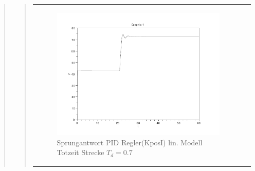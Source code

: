 \begin{quote}
    \begin{quote}
 
            \begin{center}
                \begin{tabular}{ll}
                
                \hspace{-1cm}
                    \begin{minipage}{0.6\textwidth}
                        \begin{figure}[H]
                            \includegraphics[scale=0.4, trim = 0cm 0cm 0cm
                            0cm, clip]
                            {./Bilder/4_5_Td_04_K_tilde}
                              \caption{Sprungantwort PID Regler(KposI) lin. Modell Totzeit Strecke $T_d = 0.7$}
                        \end{figure}
                    \end{minipage}
                    

\end{tabular}
\end{center}
\end{quote}
\end{quote}
